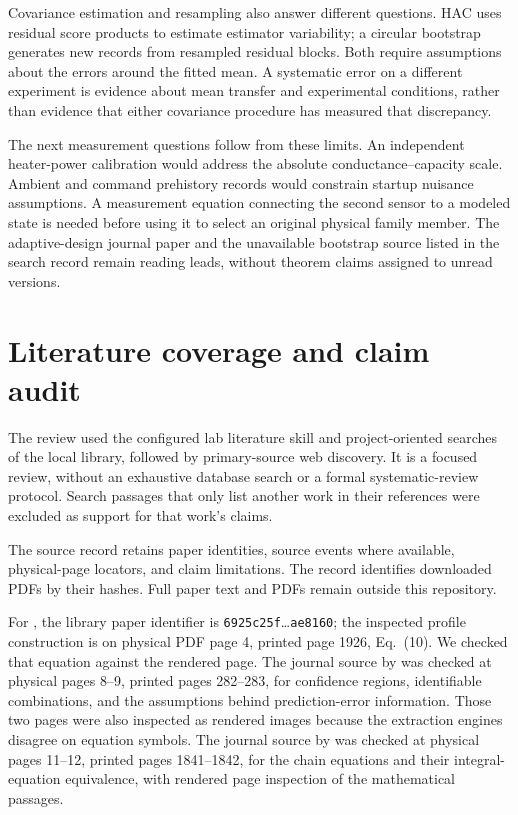 \documentclass[11pt]{article}
\begin{document}
Covariance estimation and resampling also answer different questions. HAC
uses residual score products to estimate estimator variability; a circular
bootstrap generates new records from resampled residual blocks. Both require
assumptions about the errors around the fitted mean. A systematic error on a
different experiment is evidence about mean transfer and experimental
conditions, rather than evidence that either covariance procedure has measured
that discrepancy.

The next measurement questions follow from these limits. An independent
heater-power calibration would address the absolute conductance--capacity
scale. Ambient and command prehistory records would constrain startup nuisance
assumptions. A measurement equation connecting the second sensor to a modeled
state is needed before using it to select an original physical family member.
The adaptive-design journal paper and the
unavailable bootstrap source listed in the search record remain reading leads,
without theorem claims assigned to unread versions.



\section{Literature coverage and claim audit}
The review used the configured lab literature skill and project-oriented searches
of the local library, followed by primary-source web discovery. It is a focused
review, without an exhaustive database search or a formal systematic-review
protocol. Search passages that only list another work in their references were
excluded as support for that work's claims.

The source record  retains paper identities,
source events where available, physical-page locators, and claim limitations.
The record  identifies downloaded PDFs
by their hashes. Full paper text and PDFs remain outside this repository.

For \citet{raue-2009-structural}, the library paper identifier is
\texttt{6925c25f}\ldots\texttt{ae8160}; the inspected profile construction is
on physical PDF page 4, printed page 1926, Eq.~(10). We checked that equation
against the rendered page. The journal source by
\citet{hjalmarsson-2009-system} was checked at physical pages 8--9, printed
pages 282--283, for confidence
regions, identifiable combinations, and the assumptions behind prediction-error
information. Those two pages were also inspected as rendered images because
the extraction engines disagree on equation symbols. The journal source by
\citet{hurtado-2019-generalizations} was checked at physical pages 11--12,
printed pages 1841--1842,
for the chain equations and their integral-equation equivalence, with rendered
page inspection of the mathematical passages.
\end{document}
